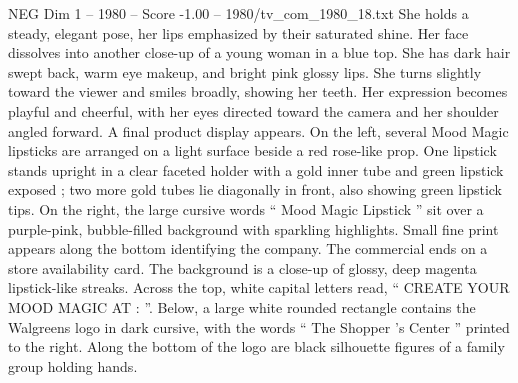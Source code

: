 \begin{textsample}{NEG Dim 1 – 1980 – Score -1.00 – 1980/tv\_com\_1980\_18.txt}
She holds a steady, elegant pose, her lips emphasized by their saturated shine.
Her face dissolves into another close-up of a young woman in a blue top.
She has dark hair swept back, warm eye makeup, and bright pink glossy lips.
She turns slightly toward the viewer and smiles broadly, showing her teeth.
Her expression becomes playful and cheerful, with her eyes directed toward the camera and her shoulder angled forward.
A final product display appears.
On the left, several Mood Magic lipsticks are arranged on a light surface beside a red rose-like prop.
One lipstick stands upright in a clear faceted holder with a gold inner tube and green lipstick exposed ; two more gold tubes lie diagonally in front, also showing green lipstick tips.
On the right, the large cursive words “ Mood Magic Lipstick ” sit over a purple-pink, bubble-filled background with sparkling highlights.
Small fine print appears along the bottom identifying the company.
The commercial ends on a store availability card.
The background is a close-up of glossy, deep magenta lipstick-like streaks.
Across the top, white capital letters read, “ CREATE YOUR MOOD MAGIC AT : ”.
Below, a large white rounded rectangle contains the Walgreens logo in dark cursive, with the words “ The Shopper ’s Center ” printed to the right.
Along the bottom of the logo are black silhouette figures of a family group holding hands.

\end{textsample}
